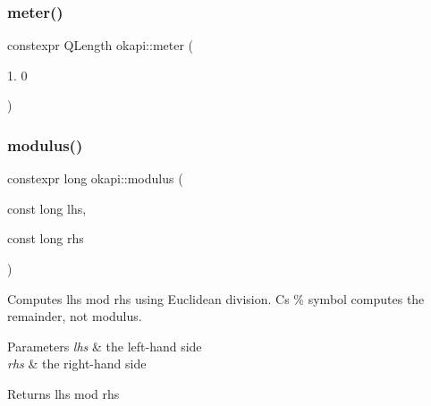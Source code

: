 \mbox{\label{namespaceokapi_a59563b3d4b18633f1c8d852e2932d1db}} 
\subsubsection{\texorpdfstring{meter()}{meter()}}
{\footnotesize\ttfamily constexpr Q\+Length okapi\+::meter (\begin{DoxyParamCaption}\item[{1.}]{0 }\end{DoxyParamCaption})}

\mbox{\label{namespaceokapi_a32aac326b5e0f0ba82bb5dea50852504}} 
\subsubsection{\texorpdfstring{modulus()}{modulus()}}
{\footnotesize\ttfamily constexpr long okapi\+::modulus (\begin{DoxyParamCaption}\item[{const long}]{lhs,  }\item[{const long}]{rhs }\end{DoxyParamCaption})\hspace{0.3cm}{\ttfamily [noexcept]}}

Computes lhs mod rhs using Euclidean division. C\textquotesingle{}s \% symbol computes the remainder, not modulus.


\begin{DoxyParams}{Parameters}
{\em lhs} & the left-\/hand side \\
\hline
{\em rhs} & the right-\/hand side \\
\hline
\end{DoxyParams}
\begin{DoxyReturn}{Returns}
lhs mod rhs 
\end{DoxyReturn}
\mbox{\label{namespaceokapi_a48bcd0bd9113d86c24325eb1003709de}} 
